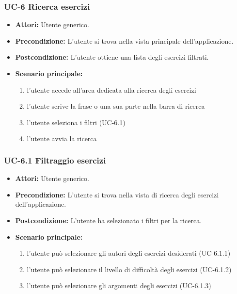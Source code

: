 	\subsubsection{UC-6 Ricerca esercizi}
		\begin{itemize}
			\item\textbf{ Attori:} Utente generico.
			\item \textbf{Precondizione:} L'utente si trova nella vista principale dell'applicazione.
			\item \textbf{Postcondizione:} L'utente ottiene una lista degli esercizi filtrati.
			\item \textbf{Scenario principale:}
				\begin{enumerate}
					\item l'utente accede all'area dedicata alla ricerca degli esercizi
					\item l'utente scrive la frase o una sua parte nella barra di ricerca
					\item l'utente seleziona i filtri (UC-6.1)
					\item l'utente avvia la ricerca
				\end{enumerate}
		\end{itemize}

	\subsubsection{UC-6.1 Filtraggio esercizi }
		\begin{itemize}
			\item \textbf{Attori:} Utente generico.
			\item \textbf{Precondizione:} L'utente si trova nella vista di ricerca degli esercizi dell'applicazione.
			\item \textbf{Postcondizione:} L'utente ha selezionato i filtri per la ricerca.
			\item \textbf{Scenario principale:}
				\begin{enumerate}
					\item l'utente può selezionare gli autori degli esercizi desiderati (UC-6.1.1)
					\item l'utente può selezionare il livello di difficoltà degli esercizi (UC-6.1.2)
					\item l'utente può selezionare gli argomenti degli esercizi (UC-6.1.3)
				\end{enumerate}
		\end{itemize}
		
